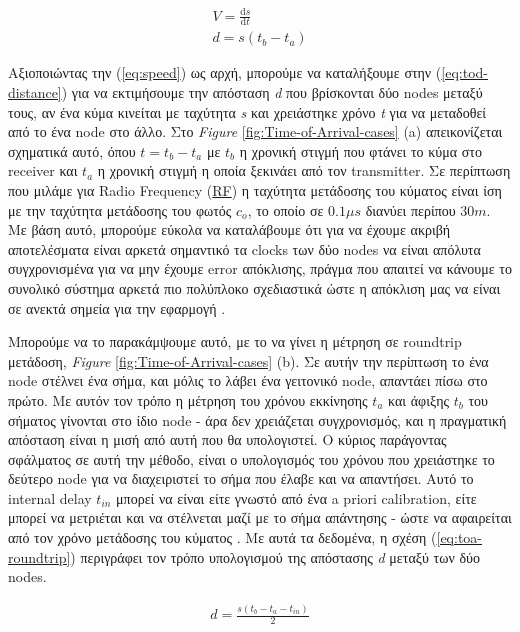 \begin{gather}
	V=\frac{\mathrm{d}s}{\mathrm{d}t} \label{eq:speed} \\
	d=s(t_b-t_a) \label{eq:tod-distance}
\end{gather}

Αξιοποιώντας την (\ref{eq:speed}) ως αρχή, μπορούμε να καταλήξουμε στην (\ref{eq:tod-distance}) για να εκτιμήσουμε
την απόσταση \emph{d} που βρίσκονται δύο nodes μεταξύ τους, αν ένα κύμα κινείται με ταχύτητα \emph{s} και χρειάστηκε 
χρόνο \emph{t} για να μεταδοθεί από το ένα node στο άλλο. Στο \emph{Figure} \ref{fig:Time-of-Arrival-cases} (a) απεικονίζεται
σχηματικά αυτό, όπου $t=t_b-t_a$ με $t_b$ η χρονική στιγμή που φτάνει το κύμα στο receiver και $t_a$
η χρονική στιγμή η οποία ξεκινάει από τον transmitter. Σε περίπτωση που μιλάμε για Radio Frequency 
(\hyperref[abbr:RF]{RF}) η ταχύτητα μετάδοσης του κύματος είναι ίση με την ταχύτητα μετάδοσης του φωτός $c_o$, το οποίο 
σε $0.1μs$ διανύει περίπου $30m$.   
Με βάση αυτό, μπορούμε εύκολα να καταλάβουμε ότι για να έχουμε ακριβή αποτελέσματα είναι αρκετά σημαντικό
τα clocks των δύο nodes να είναι απόλυτα συγχρονισμένα για να μην έχουμε error απόκλισης, πράγμα που
απαιτεί να κάνουμε το συνολικό σύστημα αρκετά πιο πολύπλοκο σχεδιαστικά 
ώστε η απόκλιση μας να είναι σε ανεκτά σημεία για την εφαρμογή \cite{wsn-Localization-systems} \cite{wsn-Localization-techniques}.

Μπορούμε να το παρακάμψουμε αυτό, με το να γίνει η μέτρηση σε roundtrip μετάδοση, \emph{Figure} \ref{fig:Time-of-Arrival-cases} (b).
Σε αυτήν την περίπτωση το ένα node στέλνει ένα σήμα, και μόλις το λάβει ένα γειτονικό node, απαντάει πίσω στο πρώτο. 
Με αυτόν τον τρόπο η μέτρηση του χρόνου εκκίνησης $t_a$ και άφιξης $t_b$ του σήματος γίνονται στο ίδιο node - 
άρα δεν χρειάζεται συγχρονισμός, και η πραγματική απόσταση είναι η μισή από αυτή που θα υπολογιστεί. Ο κύριος παράγοντας
σφάλματος σε αυτή την μέθοδο, είναι ο υπολογισμός του χρόνου που χρειάστηκε το δεύτερο node για να διαχειριστεί
το σήμα που έλαβε και να απαντήσει. Αυτό το internal delay $t_{in}$ μπορεί να είναι είτε γνωστό από 
ένα a priori calibration, είτε μπορεί να μετριέται και να στέλνεται μαζί με το σήμα απάντησης - ώστε να αφαιρείται
από τον χρόνο μετάδοσης του κύματος \cite{wsn-Localization-techniques}.
Με αυτά τα δεδομένα, η σχέση (\ref{eq:toa-roundtrip}) περιγράφει τον τρόπο υπολογισμού της
απόστασης \emph{d} μεταξύ των δύο nodes.

\begin{align}
	d=\frac{s(t_b-t_a-t_{in})}{2} \label{eq:toa-roundtrip}
\end{align}


